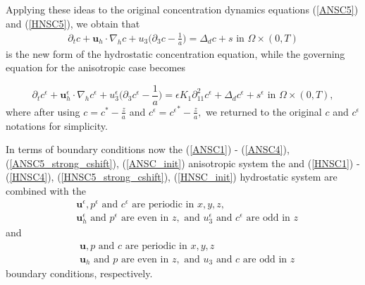 \documentclass[11pt, a4paper]{article}
\begin{document}
Applying these ideas to the original concentration dynamics equations (\ref{ANSC5}) and (\ref{HNSC5}), we obtain that
%
\begin{equation} \label{HNSC5_strong_cshift}
\begin{split}
\partial_t c + \mathbf{u}_h \cdot \nabla_h c + u_3 \bigg ( \partial_3 c - \frac{1}{a} \bigg ) = \Delta_d c + s \text{ in } \Omega \times (0,T)
\end{split}
\end{equation}
%
is the new form of the hydrostatic concentration equation, while the governing equation for the anisotropic case becomes

\begin{equation} \label{ANSC5_strong_cshift}
\partial_t c^\epsilon + \mathbf{u}_h^\epsilon \cdot \nabla_h c^\epsilon + u_3^\epsilon \bigg ( \partial_3 c^\epsilon - \frac{1}{a} \bigg )= \epsilon K_1 \partial_{11} ^ 2 c^\epsilon + \Delta_d c^\epsilon + s^\epsilon \text{ in } \Omega \times (0,T),
\end{equation}
%
where after using $c = c^* - \frac{z}{a}$ and $c^\epsilon = {c^\epsilon}^* - \frac{z}{a},$ we returned to the original $c$ and $c^\epsilon$ notations for simplicity.

In terms of boundary conditions now the (\ref{ANSC1}) - (\ref{ANSC4}), (\ref{ANSC5_strong_cshift}), (\ref{ANSC_init}) anisotropic system the and (\ref{HNSC1}) - (\ref{HNSC4}), (\ref{HNSC5_strong_cshift}), (\ref{HNSC_init}) hydrostatic system are combined with the
%
\begin{equation} \label{ANSC_bc-strong}
\begin{split}
& \mathbf{u}^\epsilon, p^\epsilon \text{ and } c^\epsilon \text{ are periodic in } x,y,z, \\
& \mathbf{u}_h^\epsilon \text{ and } p^\epsilon \text{ are even in $z$}, \text{ and } u_3^\epsilon \text{ and } c^\epsilon \text{ are odd in $z$}
\end{split}
\end{equation}
%
and
%
\begin{equation} \label{HNSC_bc-strong}
\begin{split}
& \mathbf{u}, p \text{ and } c \text{ are periodic in } x,y,z \\
& \mathbf{u}_h \text{ and } p \text{ are even in $z$}, \text{ and } u_3 \text{ and } c \text{ are odd in $z$}
\end{split}
\end{equation}
%
boundary conditions, respectively.
\end{document}
